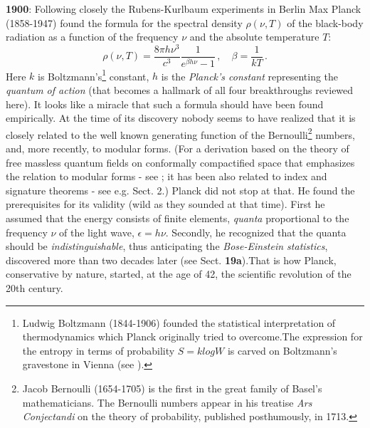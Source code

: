 \documentclass[12pt]{article}
\begin{document}
{\bf 1900}: Following closely the Rubens-Kurlbaum experiments in Berlin Max
Planck (1858-1947) found the formula for the spectral density $\rho(\nu, T)$ of
 the black-body radiation  as a function of the frequency $\nu$ and the
absolute temperature $T$:
\begin{equation}
\label{Planck}
\rho(\nu, T) = \frac{8\pi h\nu^3}{c^3} \frac{1}{e^{\beta h \nu} - 1}\,, \quad \beta = \frac{1}{kT}\,.
\end{equation}
Here $k$ is Boltzmann's\footnote{Ludwig Boltzmann (1844-1906) founded the
statistical interpretation of thermodynamics which Planck originally tried to
overcome.The expression for the entropy in terms of probability $S = k log W$
is carved on Boltzmann's gravestone in Vienna (see \cite{Bl}).} constant, $h$ is the {\it Planck's
constant} representing the {\it quantum of action} (that becomes a hallmark of
all four breakthroughs reviewed here). It looks like a miracle that such a
formula should have been found empirically. At the time of its discovery nobody
 seems to have realized that it is closely related to the well known generating
 function of the Bernoulli\footnote{Jacob Bernoulli (1654-1705) is the first in
 the great family of Basel's mathematicians. The Bernoulli numbers appear in
his treatise {\it Ars Conjectandi} on the theory of probability, published
posthumously, in 1713.} numbers, and, more recently, to modular forms. (For a
derivation based on the theory of free massless quantum fields on conformally
compactified space that emphasizes the relation to modular forms - see
\cite{NT}; it has been also related to index and signature theorems - see e.g.
\cite{H71} Sect. 2.) Planck did not stop at that. He found the prerequisites for
 its validity (wild as they sounded at that time). First he assumed that the
energy consists of finite elements, {\it quanta} proportional to the frequency
$\nu$ of the light wave, $\epsilon = h\nu$. Secondly, he recognized that the
quanta should be {\it indistinguishable}, thus anticipating the {\it
Bose-Einstein statistics}, discovered more than two decades later (see \cite{P}
 Sect. {\bf 19a}).That is how Planck, conservative by nature, started, at the
age of 42, the scientific revolution of the 20th century.
\end{document}
